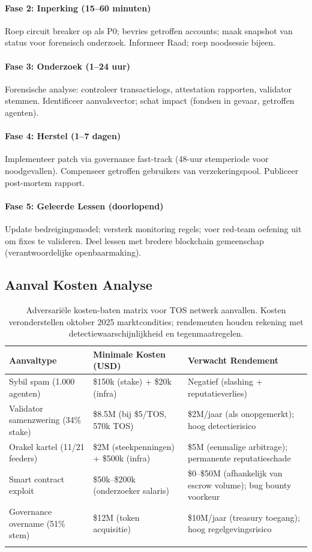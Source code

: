 \documentclass[11pt]{article}
\begin{document}
\paragraph{Fase 2: Inperking (15--60 minuten)}
Roep circuit breaker op als P0; bevries getroffen accounts; maak snapshot van status voor forensisch onderzoek. Informeer Raad; roep noodsessie bijeen.

\paragraph{Fase 3: Onderzoek (1--24 uur)}
Forensische analyse: controleer transactielogs, attestation rapporten, validator stemmen. Identificeer aanvalsvector; schat impact (fondsen in gevaar, getroffen agenten).

\paragraph{Fase 4: Herstel (1--7 dagen)}
Implementeer patch via governance fast-track (48-uur stemperiode voor noodgevallen). Compenseer getroffen gebruikers van verzekeringspool. Publiceer post-mortem rapport.

\paragraph{Fase 5: Geleerde Lessen (doorlopend)}
Update bedreigingsmodel; versterk monitoring regels; voer red-team oefening uit om fixes te valideren. Deel lessen met bredere blockchain gemeenschap (verantwoordelijke openbaarmaking).

\subsection{Aanval Kosten Analyse}

\begin{longtable}{@{}p{}p{}p{}@{}}
\toprule
\textbf{Aanvaltype} & \textbf{Minimale Kosten (USD)} & \textbf{Verwacht Rendement} \\\midrule
Sybil spam (1.000 agenten) & \$150k (stake) + \$20k (infra) & Negatief (slashing + reputatieverlies) \\
Validator samenzwering (34\% stake) & \$8.5M (bij \$5/TOS, 570k TOS) & \$2M/jaar (als onopgemerkt); hoog detectierisico \\
Orakel kartel (11/21 feeders) & \$2M (steekpenningen) + \$500k (infra) & \$5M (eenmalige arbitrage); permanente reputatieschade \\
Smart contract exploit & \$50k--\$200k (onderzoeker salaris) & \$0--\$50M (afhankelijk van escrow volume); bug bounty voorkeur \\
Governance overname (51\% stem) & \$12M (token acquisitie) & \$10M/jaar (treasury toegang); hoog regelgevingsrisico \\
\bottomrule
\caption{Adversariële kosten-baten matrix voor TOS netwerk aanvallen. Kosten veronderstellen oktober 2025 marktcondities; rendementen houden rekening met detectiewaarschijnlijkheid en tegenmaatregelen.}
\end{longtable}
\end{document}
